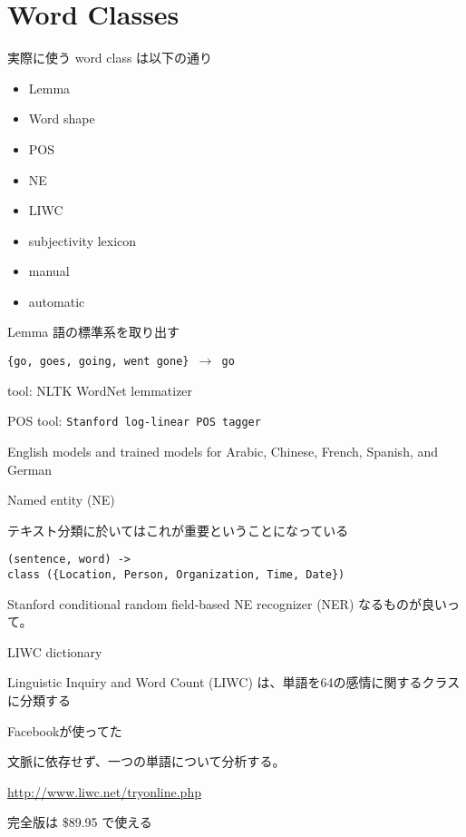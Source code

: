 \documentclass[12pt, dvipdfmx, default, cjk]{beamer}
\begin{document}
\section{Word Classes}

\begin{frame}
  実際に使う word class は以下の通り
  \begin{itemize}
    \item Lemma
    \item Word shape
    \item POS
    \item NE
    \item LIWC
    \item subjectivity lexicon
    \item manual
    \item automatic
  \end{itemize}
\end{frame}

\begin{frame}{Lemma}
  語の標準系を取り出す

  \texttt{\{go, goes, going, went gone\} $\rightarrow$ go}

  tool: NLTK WordNet lemmatizer
\end{frame}

\begin{frame}{POS}
  tool: \texttt{Stanford log-linear POS tagger}

  English models and trained models for Arabic, Chinese, French, Spanish, and German
\end{frame}

\begin{frame}[fragile]{Named entity (NE)}

  テキスト分類に於いてはこれが重要ということになっている

\begin{verbatim}
(sentence, word) ->
class ({Location, Person, Organization, Time, Date})
\end{verbatim}

Stanford conditional random field-based NE recognizer (NER)
なるものが良いって。
\end{frame}

\begin{frame}{LIWC dictionary}

  Linguistic Inquiry and Word Count (LIWC)
  は、単語を64の感情に関するクラスに分類する
  
  Facebookが使ってた

  文脈に依存せず、一つの単語について分析する。

  \url{http://www.liwc.net/tryonline.php}

  完全版は \$89.95 で使える
\end{frame}
\end{document}
